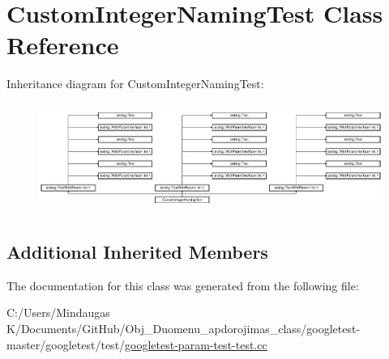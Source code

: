 \hypertarget{class_custom_integer_naming_test}{}\section{Custom\+Integer\+Naming\+Test Class Reference}
\label{class_custom_integer_naming_test}
Inheritance diagram for Custom\+Integer\+Naming\+Test\+:\begin{figure}[H]
\begin{center}
\leavevmode
\includegraphics[height=3.572568cm]{d6/d70/class_custom_integer_naming_test}
\end{center}
\end{figure}
\subsection*{Additional Inherited Members}


The documentation for this class was generated from the following file\+:\begin{DoxyCompactItemize}
\item 
C\+:/\+Users/\+Mindaugas K/\+Documents/\+Git\+Hub/\+Obj\+\_\+\+Duomenu\+\_\+apdorojimas\+\_\+class/googletest-\/master/googletest/test/\mbox{\hyperlink{googletest-master_2googletest_2test_2googletest-param-test-test_8cc}{googletest-\/param-\/test-\/test.\+cc}}\end{DoxyCompactItemize}

